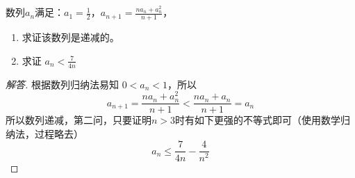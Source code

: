\begin{exercise}
  数列$a_n$满足：$a_1=\frac{1}{2}$，$a_{n+1}=\frac{na_n+a_n^2}{n+1}$，
  \begin{enumerate}
  \item 求证该数列是递减的。
  \item 求证 $a_n < \frac{7}{4n}$
  \end{enumerate}
\end{exercise}
\begin{proof}[解答]
  根据数列归纳法易知 $0<a_n<1$，所以
  \begin{equation*}
    a_{n+1}=\frac{na_n+a_n^2}{n+1} < \frac{na_n+a_n}{n+1} = a_n
  \end{equation*}
  所以数列递减，第二问，只要证明$n>3$时有如下更强的不等式即可（使用数学归纳法，过程略去）
  \begin{equation*}
    a_n \leqslant \frac{7}{4n}-\frac{4}{n^2}
  \end{equation*}
\end{proof}

